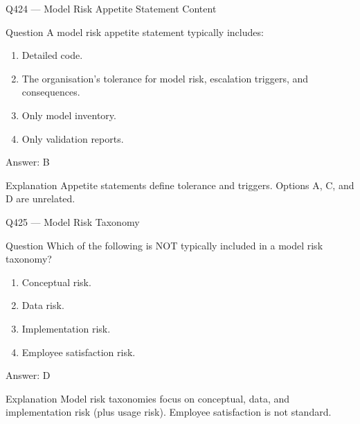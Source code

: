 \documentclass[aspectratio=169,8pt]{beamer}
\begin{document}
	\begin{frame}{Q424 --- Model Risk Appetite Statement Content}
		\begin{block}{Question}
			A model risk appetite statement typically includes:
			\begin{enumerate}
				\item Detailed code.
				\item The organisation's tolerance for model risk, escalation triggers, and consequences.
				\item Only model inventory.
				\item Only validation reports.
			\end{enumerate}
		\end{block}
		\begin{exampleblock}{Answer: B}\end{exampleblock}
		\begin{block}{Explanation}
			Appetite statements define tolerance and triggers. Options A, C, and D are unrelated.
		\end{block}
	\end{frame}
	
	\begin{frame}{Q425 --- Model Risk Taxonomy}
		\begin{block}{Question}
			Which of the following is NOT typically included in a model risk taxonomy?
			\begin{enumerate}
				\item Conceptual risk.
				\item Data risk.
				\item Implementation risk.
				\item Employee satisfaction risk.
			\end{enumerate}
		\end{block}
		\begin{exampleblock}{Answer: D}\end{exampleblock}
		\begin{block}{Explanation}
			Model risk taxonomies focus on conceptual, data, and implementation risk (plus usage risk). Employee satisfaction is not standard.
		\end{block}
	\end{frame}
	
\end{document}

